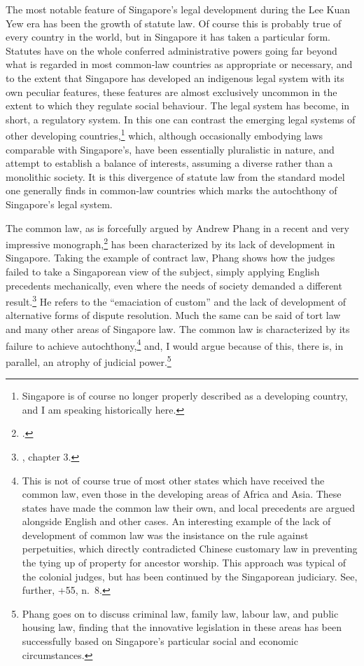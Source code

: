 The most notable feature of Singapore's legal development during
the Lee Kuan Yew era has been the growth of statute law. Of
course this is probably true of every country in the world, but
in Singapore it has taken a particular form. Statutes have on the
whole conferred administrative powers going far beyond what is
regarded in most common-law countries as appropriate or
necessary, and to the extent that Singapore has developed an
indigenous legal system with its own peculiar features, these
features are almost exclusively uncommon in the extent to which
they regulate social behaviour. The legal system has become, in
short, a regulatory system. In this one can contrast the emerging
legal systems of other developing countries,\footnote{Singapore
  is of course no longer properly described as a developing
  country, and I am speaking historically here.} which, although
occasionally embodying laws comparable with Singapore's, have
been essentially pluralistic in nature, and attempt to establish
a balance of interests, assuming a diverse rather than a
monolithic society. It is this divergence of statute law from the
standard model one generally finds in common-law countries which
marks the autochthony of Singapore's legal system.

The common law, as is forcefully argued by Andrew Phang in a
recent and very impressive monograph,\footnote{
  .} has been characterized by its
lack of development in Singapore.  Taking the example of contract
law, Phang shows how the judges failed to take a Singaporean view
of the subject, simply applying English precedents mechanically,
even where the needs of society demanded a different
result.\footnote{, chapter 3.} He
refers to the ``emaciation of custom'' and the lack of
development of alternative forms of dispute resolution. Much the
same can be said of tort law and many other areas of Singapore
law.  The common law is characterized by its failure to achieve
autochthony,\footnote{ This is not of course true of most other
  states which have received the common law, even those in the
  developing areas of Africa and Asia. These states have made the
  common law their own, and local precedents are argued alongside
  English and other cases.  An interesting example of the lack of
  development of common law was the insistance on the rule
  against perpetuities, which directly contradicted Chinese
  customary law in preventing the tying up of property for
  ancestor worship. This approach was typical of the colonial
  judges, but has been continued by the Singaporean judiciary.
  See, further, +{55, n.~8}.} and, I
would argue because of this, there is, in parallel, an atrophy of
judicial power.\footnote{Phang goes on to discuss criminal law,
  family law, labour law, and public housing law, finding that
  the innovative legislation in these areas has been successfully
  based on Singapore's particular social and economic
  circumstances.}


